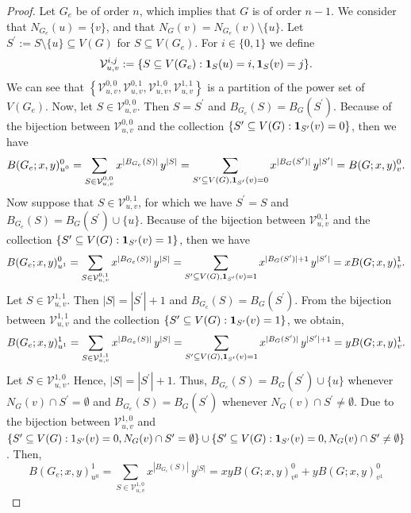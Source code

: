 \documentclass[review]{elsarticle}
\begin{document}
\begin{proof}
Let $G_{e}$ be of order $n$, which implies that $G$ is of order $n-1$. We consider that $N_{G_{e}}(u) = \{v\}$, and that $N_{G}(v) = N_{G_{e}}(v)\setminus \{u\}$. Let $S^\prime := S\setminus \{u\} \subseteq V(G)$ for $S \subseteq V(G_{e})$. For $i \in \{0,1\}$ we define
$$\mathcal{V}_{u,v}^{i,j} := \{S \subseteq V(G_{e}): {\bf 1}_{S}(u) = i, {\bf 1}_{S}(v) = j\}.$$
We can see that $\left\{\mathcal{V}_{u,v}^{0,0}, \mathcal{V}_{u,v}^{0,1},\mathcal{V}_{u,v}^{1,0}, \mathcal{V}_{u,v}^{1,1}\right\}$ is a partition of the power set of $V(G_{e})$. Now, let $S \in \mathcal{V}_{u,v}^{0,0}$. Then $S = S^\prime$ and $B_{G_{e}}(S) = B_{G}(S^\prime)$. Because of the bijection between $\mathcal{V}_{u,v}^{0,0}$ and the collection $\{S^\prime \subseteq V(G): {\bf 1}_{S^\prime}(v) = 0\}$, then we have 
\begin{equation}\label{eq:BGE1}
    B(G_{e};x,y)_{u^{0}}^{0} = \sum_{S \in \mathcal{V}_{u,v}^{0,0}}x^{|B_{G_{e}}(S)|}\,y^{|S|} = \sum_{S^\prime \subseteq V(G),{\bf 1}_{S^\prime}(v) = 0}x^{|B_{G}(S^\prime)|}\,y^{|S^\prime|} = B(G;x,y)_{v}^{0}.
\end{equation}
Now suppose that $S \in \mathcal{V}_{u,v}^{0,1}$, for which we have $S^\prime = S$ and $B_{G_{e}}(S) = B_{G}(S^\prime)\cup \{u\}$. %
Because of the bijection between $\mathcal{V}_{u,v}^{0,1}$ and the collection $\{S^\prime \subseteq V(G): {\bf 1}_{S^\prime}(v) = 1\}$, then we have 
\begin{equation}\label{eq:BGE2}
    B(G_{e};x,y)_{u^{1}}^{0} = \sum_{S \in \mathcal{V}_{u,v}^{0,1}}x^{|B_{G_{e}}(S)|}\,y^{|S|} = \sum_{S^\prime \subseteq V(G),{\bf 1}_{S^\prime}(v) = 1}x^{|B_{G}(S^\prime)| + 1}\,y^{|S^\prime|} = xB(G;x,y)_{v}^{1}.
\end{equation}
Let $S \in \mathcal{V}_{u,v}^{1,1}$. Then $|S| = |S^\prime| + 1$ and $B_{G_{e}}(S) = B_{G}(S^\prime)$. %
From the bijection between $\mathcal{V}_{u,v}^{1,1}$ and the collection $\{S^\prime \subseteq V(G): {\bf 1}_{S^\prime}(v) = 1\}$, we obtain,
\begin{equation}\label{eq:BGE3}
    B(G_{e};x,y)_{u^{1}}^{1} = \sum_{S \in \mathcal{V}_{u,v}^{1,1}}x^{|B_{G_{e}}(S)|}\, y^{|S|} = \sum_{S^\prime \subseteq V(G),{\bf 1}_{S^\prime}(v) = 1}x^{|B_{G}(S^\prime)|}\,y^{|S^\prime|+1} = yB(G;x,y)_{v}^{1}.
\end{equation}
Let $S \in \mathcal{V}_{u,v}^{1,0}$. Hence, $|S| = |S^\prime|+1$. Thus, $B_{G_{e}}(S) = B_{G}(S^\prime)\cup\{u\}$ whenever $N_{G}(v)\cap S^\prime = \emptyset$ and $B_{G_{e}}(S) = B_{G}(S^\prime)$ whenever $N_{G}(v)\cap S^\prime \not= \emptyset$. Due to the bijection between $\mathcal{V}_{u,v}^{1,0}$ and $\{S^\prime \subseteq V(G):1_{S^\prime}(v) = 0,N_{G}(v)\cap S^\prime = \emptyset\} \cup \{S^\prime \subseteq V(G): {\bf 1}_{S^\prime}(v) = 0,N_{G}(v)\cap S^\prime \not= \emptyset\}$. Then,
\begin{equation}\label{eq:BFE4}
    B(G_{e};x,y)_{u^{0}}^{1}  = \sum_{S \in \mathcal{V}_{u,v}^{1,0}}x^{|B_{G_{e}}(S)|}\,y^{|S|} = xyB(G;x,y)_{v^{0}}^{0}+yB(G;x,y)_{v^{1}}^{0}
\end{equation}
    

\end{proof}
\end{document}

